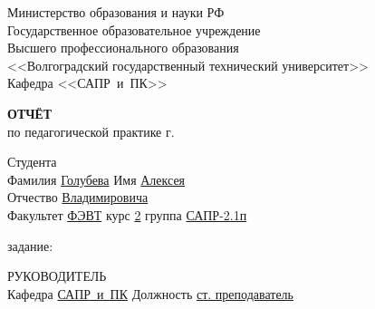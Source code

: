 \documentclass[a4paper, 14pt]{extreport}
\begin{document}
    \begin{titlepage}
        \begin{center}
            Министерство образования и науки РФ \\
            Государственное образовательное учреждение\\
            Высшего профессионального образования\\
            <<Волгоградский государственный технический университет>>\\
            Кафедра <<САПР~и~ПК>>
        \end{center}
        \vspace{2.0cm}
        \begin{center}
            \large \textbf{ОТЧЁТ} \\
            по педагогической практике \the\year г.
        \end{center}
        \begin{flushleft}
            Студента\\
            Фамилия \underline{Голубева\hspace{3.1cm}} 
            Имя \underline{Алексея\hspace{2.1cm}}\\
            Отчество \underline{Владимировича\hspace{1.6cm}}\\
            Факультет \underline{ФЭВТ\hspace{3.45cm}} курс \underline{2\hspace{1.5cm}} 
            группа \underline{САПР-2.1п\hspace{1.9cm}}\\
        \end{flushleft}
        \vspace{1.0cm}
         задание: \underline{\hspace{22.3em}}\\
        \underline{\hspace{\textwidth}}
        \underline{\hspace{\textwidth}}
        \underline{\hspace{\textwidth}}
        \underline{\hspace{\textwidth}}
        \vspace{2.0cm}
        \begin{flushleft}
            РУКОВОДИТЕЛЬ\\
            Кафедра \underline{САПР~и~ПК\hspace{2.4cm}} Должность \underline{ст. преподаватель\hspace{2.45em}} \\

\end{flushleft}
\end{titlepage}
\end{document}
